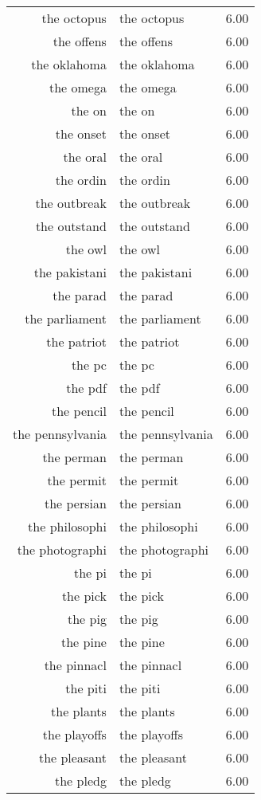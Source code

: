 \begin{table}[ht]
\begin{tabular}{rlr}
  the octopus & the octopus & 6.00 \\ 
  the offens & the offens & 6.00 \\ 
  the oklahoma & the oklahoma & 6.00 \\ 
  the omega & the omega & 6.00 \\ 
  the on & the on & 6.00 \\ 
  the onset & the onset & 6.00 \\ 
  the oral & the oral & 6.00 \\ 
  the ordin & the ordin & 6.00 \\ 
  the outbreak & the outbreak & 6.00 \\ 
  the outstand & the outstand & 6.00 \\ 
  the owl & the owl & 6.00 \\ 
  the pakistani & the pakistani & 6.00 \\ 
  the parad & the parad & 6.00 \\ 
  the parliament & the parliament & 6.00 \\ 
  the patriot & the patriot & 6.00 \\ 
  the pc & the pc & 6.00 \\ 
  the pdf & the pdf & 6.00 \\ 
  the pencil & the pencil & 6.00 \\ 
  the pennsylvania & the pennsylvania & 6.00 \\ 
  the perman & the perman & 6.00 \\ 
  the permit & the permit & 6.00 \\ 
  the persian & the persian & 6.00 \\ 
  the philosophi & the philosophi & 6.00 \\ 
  the photographi & the photographi & 6.00 \\ 
  the pi & the pi & 6.00 \\ 
  the pick & the pick & 6.00 \\ 
  the pig & the pig & 6.00 \\ 
  the pine & the pine & 6.00 \\ 
  the pinnacl & the pinnacl & 6.00 \\ 
  the piti & the piti & 6.00 \\ 
  the plants & the plants & 6.00 \\ 
  the playoffs & the playoffs & 6.00 \\ 
  the pleasant & the pleasant & 6.00 \\ 
  the pledg & the pledg & 6.00 \\ 

\end{tabular}
\end{table}
